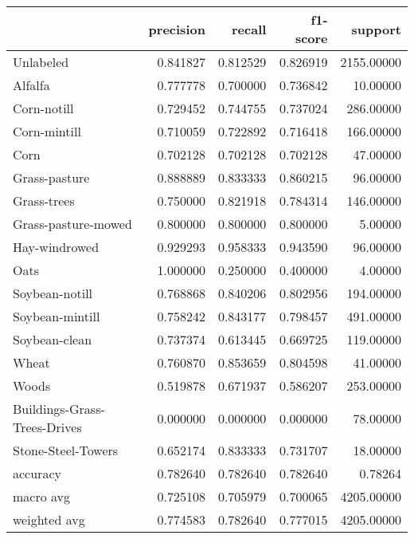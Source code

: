 \begin{tabular}{lrrrr}
\toprule
{} &  precision &    recall &  f1-score &     support \\
\midrule
Unlabeled                    &   0.841827 &  0.812529 &  0.826919 &  2155.00000 \\
Alfalfa                      &   0.777778 &  0.700000 &  0.736842 &    10.00000 \\
Corn-notill                  &   0.729452 &  0.744755 &  0.737024 &   286.00000 \\
Corn-mintill                 &   0.710059 &  0.722892 &  0.716418 &   166.00000 \\
Corn                         &   0.702128 &  0.702128 &  0.702128 &    47.00000 \\
Grass-pasture                &   0.888889 &  0.833333 &  0.860215 &    96.00000 \\
Grass-trees                  &   0.750000 &  0.821918 &  0.784314 &   146.00000 \\
Grass-pasture-mowed          &   0.800000 &  0.800000 &  0.800000 &     5.00000 \\
Hay-windrowed                &   0.929293 &  0.958333 &  0.943590 &    96.00000 \\
Oats                         &   1.000000 &  0.250000 &  0.400000 &     4.00000 \\
Soybean-notill               &   0.768868 &  0.840206 &  0.802956 &   194.00000 \\
Soybean-mintill              &   0.758242 &  0.843177 &  0.798457 &   491.00000 \\
Soybean-clean                &   0.737374 &  0.613445 &  0.669725 &   119.00000 \\
Wheat                        &   0.760870 &  0.853659 &  0.804598 &    41.00000 \\
Woods                        &   0.519878 &  0.671937 &  0.586207 &   253.00000 \\
Buildings-Grass-Trees-Drives &   0.000000 &  0.000000 &  0.000000 &    78.00000 \\
Stone-Steel-Towers           &   0.652174 &  0.833333 &  0.731707 &    18.00000 \\
accuracy                     &   0.782640 &  0.782640 &  0.782640 &     0.78264 \\
macro avg                    &   0.725108 &  0.705979 &  0.700065 &  4205.00000 \\
weighted avg                 &   0.774583 &  0.782640 &  0.777015 &  4205.00000 \\
\bottomrule
\end{tabular}
